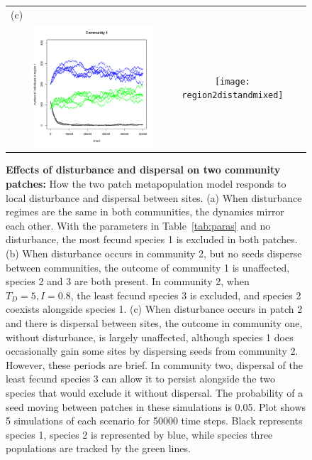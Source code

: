 \begin{figure}[htbp]
\begin{center}
\begin{tabular}{ccc}
(c)&&\\
&\includegraphics[width=2in]{region1distandmixed} &\texttt{[image: region2distandmixed]}
\end{tabular}
\caption[Effects of disturbance and dispersal on two community patches]{\textbf{Effects of disturbance and dispersal on two community patches:} How the two patch metapopulation model responds to local disturbance and dispersal between sites. (a) When disturbance regimes are the same in both communities, the dynamics mirror each other. With the parameters in Table~\ref{tab:paras} and no disturbance, the most fecund species 1 is excluded in both patches. (b) When disturbance occurs in community 2, but no seeds disperse between communities, the outcome of community 1 is unaffected, species 2 and 3 are both present. In community 2, when $T_D=5, I=0.8$, the least fecund species 3 is excluded, and species 2 coexists alongside species 1. (c) When disturbance occurs in patch 2 and there is dispersal between sites, the outcome in community one, without disturbance, is largely unaffected, although species 1 does occasionally gain some sites by dispersing seeds from community 2. However, these periods are brief. In community two, dispersal of the least fecund species 3 can allow it to persist alongside the two species that would exclude it without dispersal. The probability of a seed moving between patches in these simulations is 0.05. Plot shows 5 simulations of each scenario for 50000 time steps. Black represents species 1, species 2 is represented by blue, while species three populations are tracked by the green lines.}
\label{fig:regions}
\end{center}
\end{figure}

